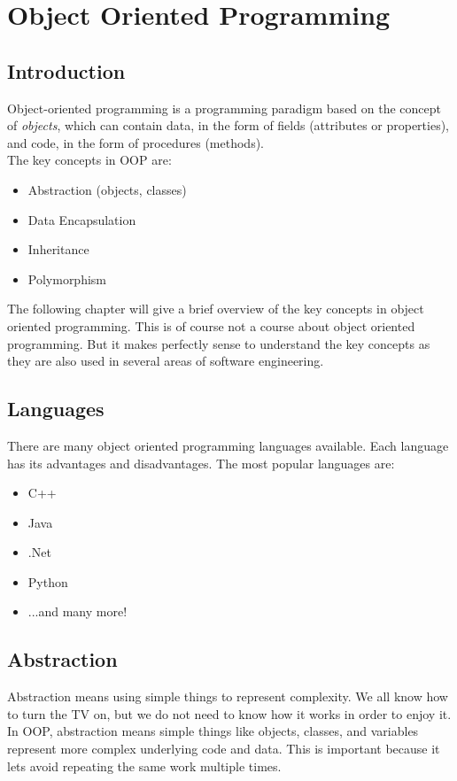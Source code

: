 \chapter{Object Oriented Programming}
\section{Introduction}
Object-oriented programming is a programming paradigm based on the
concept of \emph{objects}, which can contain data, in the form of
fields (attributes or properties), and code, in the form of procedures
(methods).\\
The key concepts in OOP are:
\begin{itemize}
\item Abstraction (objects, classes)
\item Data Encapsulation
\item Inheritance
\item Polymorphism
\end{itemize}
The following chapter will give a brief overview of the key concepts
in object oriented programming. This is of course not a course about
object oriented programming. But it makes perfectly sense to understand
the key concepts as they are also used in several areas of software
engineering.

\section{Languages}
There are many object oriented programming languages available.
Each language has its advantages and disadvantages. The most popular
languages are:
\begin{itemize}
\item C++
\item Java
\item .Net
\item Python
\item ...and many more!
\end{itemize}

\section{Abstraction}
Abstraction means using simple things to represent complexity.
We all know how to turn the TV on, but we do not need to know how
it works in order to enjoy it. In OOP, abstraction means simple
things like objects, classes, and variables represent more complex
underlying code and data. This is important because it lets avoid
repeating the same work multiple times.

